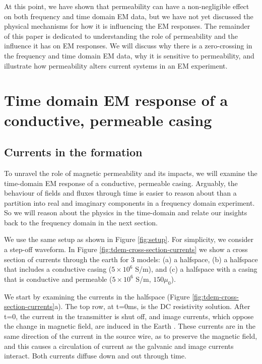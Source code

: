 \documentclass[onecolumn, extra, mreferee]{gji}
\begin{document}


\bigskip

At this point, we have shown that permeability can have a non-negligible effect on both frequency and time domain EM data, but we have not yet discussed the physical mechanisms for how it is influencing the EM responses. The remainder of this paper is dedicated to understanding the role of permeability and the influence it has on EM responses. We will discuss why there is a zero-crossing in the frequency and time domain EM data, why it is sensitive to permeability, and illustrate how permeability alters current systems in an EM experiment.

\section{Time domain EM response of a conductive, permeable casing}
\label{sec:tdem}

\subsection{Currents in the formation}

To unravel the role of magnetic permeability and its impacts, we will examine the time-domain EM response of a conductive, permeable casing. Arguably, the behaviour of fields and fluxes through time is easier to reason about than a partition into real and imaginary components in a frequency domain experiment. So we will reason about the physics in the time-domain and relate our insights back to the frequency domain in the next section.

We use the same setup as shown in Figure \ref{fig:setup}. For simplicity, we consider a step-off waveform. In Figure \ref{fig:tdem-cross-section-currents} we show a cross section of currents through the earth for 3 models: (a) a halfspace, (b) a halfspace that includes a conductive casing ($5\times10^6$ S/m), and (c) a halfspace with a casing that is conductive and permeable ($5\times10^6$ S/m, $150\mu_0$).

We start by examining the currents in the halfspace (Figure \ref{fig:tdem-cross-section-currents}a). The top row, at t=0ms, is the DC resistivity solution. After t=0, the current in the transmitter is shut off, and image currents, which oppose the change in magnetic field, are induced in the Earth \citep{nabighian_quasi-static_1979}. These currents are in the same direction of the current in the source wire, as to preserve the magnetic field, and this causes a circulation of current as the galvanic and image currents interact. Both currents diffuse down and out through time.
\end{document}
